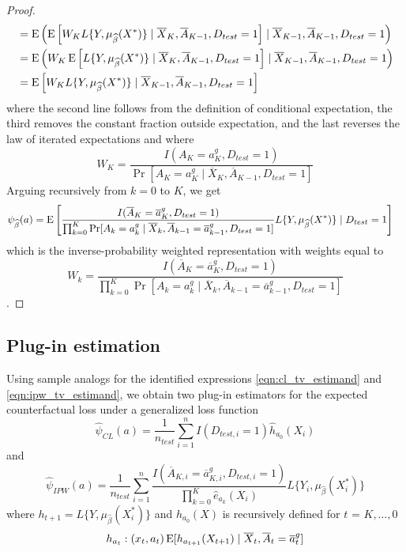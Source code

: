 \begin{proof}
\begin{align*}
        &= \operatorname{E}\left(\operatorname{E}\left[W_K L\{Y, \mu_{\widehat{\beta}}(X^*)\} \mid \overline{X}_K, \overline{A}_{K-1}, D_{test} = 1\right] \mid \overline{X}_{K-1}, \overline{A}_{K-1}, D_{test} = 1\right)\\
        &= \operatorname{E}\left(W_K \operatorname{E}\left[L\{Y, \mu_{\widehat{\beta}}(X^*)\} \mid \overline{X}_K, \overline{A}_{K-1}, D_{test} = 1\right] \mid \overline{X}_{K-1}, \overline{A}_{K-1}, D_{test} = 1\right)\\
        &= \operatorname{E}\left[W_K L\{Y, \mu_{\widehat{\beta}}(X^*)\} \mid \overline{X}_{K-1}, \overline{A}_{K-1}, D_{test} = 1\right]
    \end{align*}
    where the second line follows from the definition of conditional expectation, the third removes the constant fraction outside expectation, and the last reverses the law of iterated expectations and where 
    $$W_K = \frac{I(A_K = a_K^g, D_{test} = 1)}{\Pr[A_K = a_K^g \mid \overline{X}_K, \overline{A}_{K-1}, D_{test} = 1]}$$
    Arguing recursively from $k = 0$ to $K$, we get
    \begin{align*}
        \psi_{\widehat{\beta}}(a) &= \operatorname{E}\left[\frac{I(\overline{A}_K = \overline{a}^g_K, D_{test} = 1)}{\prod_{k=0}^K\Pr[A_k = a^g_k \mid \overline{X}_k, \overline{A}_{k-1} = \overline{a}^g_{k-1}, D_{test} = 1]}L\{Y, \mu_{\widehat{\beta}}(X^*)\} \mid D_{test} = 1\right] 
    \end{align*}
    which is the inverse-probability weighted representation with weights equal to 
    $$W_k = \frac{I(\overline{A}_K = \overline{a}^g_K, D_{test} = 1)}{\prod_{k=0}^K\Pr[A_k = a^g_k \mid \overline{X}_k, \overline{A}_{k-1} = \overline{a}^g_{k-1}, D_{test} = 1]}$$
    .
\end{proof}

\subsection{Plug-in estimation}

Using sample analogs for the identified expressions \ref{eqn:cl_tv_estimand} and \ref{eqn:ipw_tv_estimand}, we obtain two plug-in estimators for the expected counterfactual loss under a generalized loss function
\begin{equation*}
    \widehat{\psi}_{CL}(a) = \frac{1}{n_{test}}\sum_{i=1}^nI(D_{test, i} = 1)\widehat{h}_{a_0}(X_i)
\end{equation*}
and 
\begin{equation*}
    \widehat{\psi}_{IPW}(a) = \frac{1}{n_{test}}\sum_{i=1}^n \frac{I(\overline{A}_{K,i} = \overline{a}^g_{K,i}, D_{test,i} = 1)}{\prod_{k=0}^K \widehat{e}_{a_k}(X_i)} L\{Y_i, \mu_{\widehat{\beta}}(X^*_i)\}
\end{equation*}
where $h_{t+1} = L\{Y, \mu_{\widehat{\beta}}(X^*_i)\}$ and $h_{a_0}(X)$ is recursively defined for $t$ = $K, \ldots, 0$
\[h_{a_t} : (x_t, a_t) \operatorname{E}[ h_{a_{t+1}}(X_{t+1}) \mid \overline{X}_t, \overline{A}_t = \overline{a}^g_t]\]

